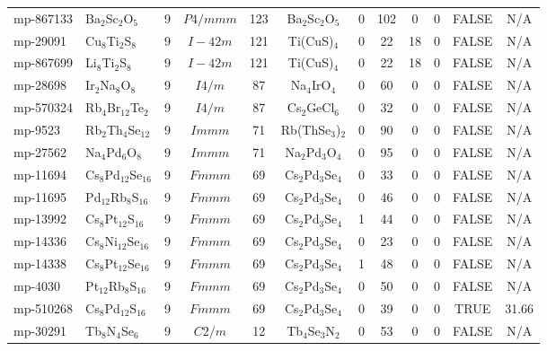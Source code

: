 {\begin{longtable}{llcccccccccc}
    mp-867133 & Ba$_{2}$Sc$_{2}$O$_{5}$ & 9     & $P4/mmm$ & 123   & Ba$_{2}$Sc$_{2}$O$_{5}$ & 0     & 102   & 0     & 0     & FALSE & N/A \\
    mp-29091 & Cu$_{8}$Ti$_{2}$S$_{8}$ & 9     & $I-42m$ & 121   & Ti(CuS)$_{4}$ & 0     & 22    & 18    & 0     & FALSE & N/A \\
    mp-867699 & Li$_{8}$Ti$_{2}$S$_{8}$ & 9     & $I-42m$ & 121   & Ti(CuS)$_{4}$ & 0     & 22    & 18    & 0     & FALSE & N/A \\
    mp-28698 & Ir$_{2}$Na$_{8}$O$_{8}$ & 9     & $I4/m$ & 87    & Na$_{4}$IrO$_{4}$ & 0     & 60    & 0     & 0     & FALSE & N/A \\
    mp-570324 & Rb$_{4}$Br$_{12}$Te$_{2}$ & 9     & $I4/m$ & 87    & Cs$_{2}$GeCl$_{6}$ & 0     & 32    & 0     & 0     & FALSE & N/A \\
    mp-9523 & Rb$_{2}$Th$_{4}$Se$_{12}$ & 9     & $Immm$ & 71    & Rb(ThSe$_{3}$)$_{2}$ & 0     & 90    & 0     & 0     & FALSE & N/A \\
    mp-27562 & Na$_{4}$Pd$_{6}$O$_{8}$ & 9     & $Immm$ & 71    & Na$_{2}$Pd$_{3}$O$_{4}$ & 0     & 95    & 0     & 0     & FALSE & N/A \\
    mp-11694 & Cs$_{8}$Pd$_{12}$Se$_{16}$ & 9     & $Fmmm$ & 69    & Cs$_{2}$Pd$_{3}$Se$_{4}$ & 0     & 33    & 0     & 0     & FALSE & N/A \\
    mp-11695 & Pd$_{12}$Rb$_{8}$S$_{16}$ & 9     & $Fmmm$ & 69    & Cs$_{2}$Pd$_{3}$Se$_{4}$ & 0     & 46    & 0     & 0     & FALSE & N/A \\
    mp-13992 & Cs$_{8}$Pt$_{12}$S$_{16}$ & 9     & $Fmmm$ & 69    & Cs$_{2}$Pd$_{3}$Se$_{4}$ & 1     & 44    & 0     & 0     & FALSE & N/A \\
    mp-14336 & Cs$_{8}$Ni$_{12}$Se$_{16}$ & 9     & $Fmmm$ & 69    & Cs$_{2}$Pd$_{3}$Se$_{4}$ & 0     & 23    & 0     & 0     & FALSE & N/A \\
    mp-14338 & Cs$_{8}$Pt$_{12}$Se$_{16}$ & 9     & $Fmmm$ & 69    & Cs$_{2}$Pd$_{3}$Se$_{4}$ & 1     & 48    & 0     & 0     & FALSE & N/A \\
    mp-4030 & Pt$_{12}$Rb$_{8}$S$_{16}$ & 9     & $Fmmm$ & 69    & Cs$_{2}$Pd$_{3}$Se$_{4}$ & 0     & 50    & 0     & 0     & FALSE & N/A \\
    mp-510268 & Cs$_{8}$Pd$_{12}$S$_{16}$ & 9     & $Fmmm$ & 69    & Cs$_{2}$Pd$_{3}$Se$_{4}$ & 0     & 39    & 0     & 0     & TRUE  & 31.66  \\
    mp-30291 & Tb$_{8}$N$_{4}$Se$_{6}$ & 9     & $C2/m$ & 12    & Tb$_{4}$Se$_{3}$N$_{2}$ & 0     & 53    & 0     & 0     & FALSE & N/A \\

\end{longtable}}

